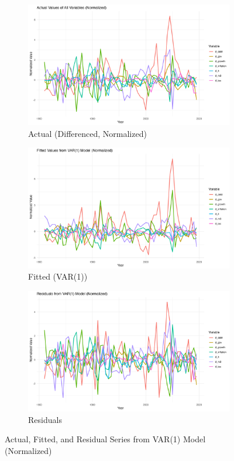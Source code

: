 \documentclass[a4paper,12pt]{article}
\begin{document}
\begin{figure}[H]
  \centering
  \begin{subfigure}[b]{0.32\textwidth}
    \includegraphics[width=\textwidth]{../results/var1_actual_all.png}
    \caption{Actual (Differenced, Normalized)}
  \end{subfigure}
  \hfill
  \begin{subfigure}[b]{0.32\textwidth}
    \includegraphics[width=\textwidth]{../results/var1_fitted_all.png}
    \caption{Fitted (VAR(1))}
  \end{subfigure}
  \hfill
  \begin{subfigure}[b]{0.32\textwidth}
    \includegraphics[width=\textwidth]{../results/var1_residuals_all.png}
    \caption{Residuals}
  \end{subfigure}
  \caption{Actual, Fitted, and Residual Series from VAR(1) Model (Normalized)}
  \label{fig:var1_allseries}
\end{figure}
\end{document}
